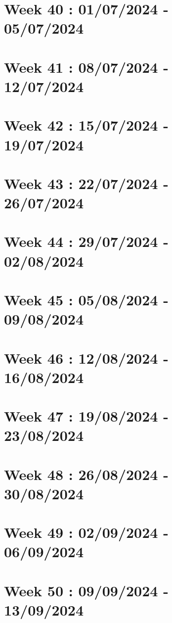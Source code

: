 \documentclass[french]{article}
\begin{document}
	\section{Week 40 : 01/07/2024 - 05/07/2024}
	

	\section{Week 41 : 08/07/2024 - 12/07/2024}
	

	\section{Week 42 : 15/07/2024 - 19/07/2024}
	

	\section{Week 43 : 22/07/2024 - 26/07/2024}
	

	\section{Week 44 : 29/07/2024 - 02/08/2024}
	

	\section{Week 45 : 05/08/2024 - 09/08/2024}
	

	\section{Week 46 : 12/08/2024 - 16/08/2024}
	

	\section{Week 47 : 19/08/2024 - 23/08/2024}
	

	\section{Week 48 : 26/08/2024 - 30/08/2024}
	

	\section{Week 49 : 02/09/2024 - 06/09/2024}
	

	\section{Week 50 : 09/09/2024 - 13/09/2024}
\end{document}
